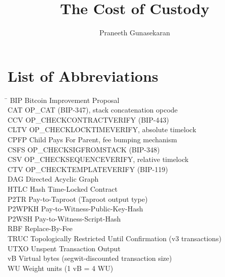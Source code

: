 \documentclass[doublespace,nopageskip]{VTthesis}
\title{The Cost of Custody}
\author{Praneeth Gunasekaran}
\begin{document}
\frontmatter
\maketitle
\tableofcontents
\listoffigures
\listoftables

\chapter*{List of Abbreviations}
\begin{tabbing}
\hspace{3cm} \= \kill
BIP     \> Bitcoin Improvement Proposal \\
CAT     \> OP\_CAT (BIP-347), stack concatenation opcode \\
CCV     \> OP\_CHECKCONTRACTVERIFY (BIP-443) \\
CLTV    \> OP\_CHECKLOCKTIMEVERIFY, absolute timelock \\
CPFP    \> Child Pays For Parent, fee bumping mechanism \\
CSFS    \> OP\_CHECKSIGFROMSTACK (BIP-348) \\
CSV     \> OP\_CHECKSEQUENCEVERIFY, relative timelock \\
CTV     \> OP\_CHECKTEMPLATEVERIFY (BIP-119) \\
DAG     \> Directed Acyclic Graph \\
HTLC    \> Hash Time-Locked Contract \\
P2TR    \> Pay-to-Taproot (Taproot output type) \\
P2WPKH  \> Pay-to-Witness-Public-Key-Hash \\
P2WSH   \> Pay-to-Witness-Script-Hash \\
RBF     \> Replace-By-Fee \\
TRUC    \> Topologically Restricted Until Confirmation (v3 transactions) \\
UTXO    \> Unspent Transaction Output \\
vB      \> Virtual bytes (segwit-discounted transaction size) \\
WU      \> Weight units (1 vB = 4 WU)
\end{tabbing}

\mainmatter














\appendix
\begin{appendices}
  
  
  
\end{appendices}
\end{document}
